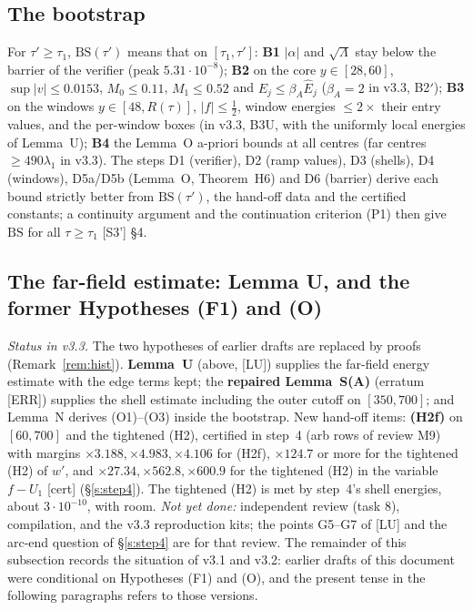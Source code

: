 \documentclass[11pt]{amsart}
\theoremstyle{definition}
\theoremstyle{remark}
\newcommand{\Lam}{\Lambda}
\newcommand{\dref}[1]{[\textsf{#1}]}
\begin{document}
\subsection{The bootstrap}\label{ss:boot}
For $\tau'\ge\tau_1$, $\mathrm{BS}(\tau')$ means that on $[\tau_1,\tau']$: \textbf{B1} $|\alpha|$ and $\sqrt\Lam$ stay below the barrier of the verifier (peak $5.31\cdot10^{-8}$); \textbf{B2} on the core $y\in[28,60]$, $\sup|v|\le0.0153$, $M_0\le0.11$, $M_1\le0.52$ and $E_j\le\beta_A\hat E_j$ ($\beta_A=2$ in v3.3, B2$'$); \textbf{B3} on the windows $y\in[48,R(\tau)]$, $|f|\le\frac12$, window energies $\le2\times$ their entry values, and the per-window boxes (in v3.3, B3U, with the uniformly local energies of Lemma~U); \textbf{B4} the Lemma~O a-priori bounds at all centres (far centres $\ge490\lambda_1$ in v3.3). The steps D1 (verifier), D2 (ramp values), D3 (shells), D4 (windows), D5a/D5b (Lemma~O, Theorem~H6) and D6 (barrier) derive each bound strictly better from $\mathrm{BS}(\tau')$, the hand-off data and the certified constants; a continuity argument and the continuation criterion (P1) then give $\mathrm{BS}$ for all $\tau\ge\tau_1$ \dref{S3'} \S4.

\subsection{The far-field estimate: Lemma U, and the former Hypotheses (F1) and (O)}\label{ss:gap}
\emph{Status in v3.3.} The two hypotheses of earlier drafts are replaced by proofs (Remark~\ref{rem:hist}). \textbf{Lemma~U} (above, \dref{LU}) supplies the far-field energy estimate with the edge terms kept; the \textbf{repaired Lemma~S(A)} (erratum \dref{ERR}) supplies the shell estimate including the outer cutoff on $[350,700]$; and Lemma~N derives (O1)--(O3) inside the bootstrap. New hand-off items: \textbf{(H2f)} on $[60,700]$ and the tightened (H2), certified in step~4 (arb rows of review M9) with margins $\times3.188,\times4.983,\times4.106$ for (H2f), $\times124.7$ or more for the tightened (H2) of $w'$, and $\times27.34,\times562.8,\times600.9$ for the tightened (H2) in the variable $f-U_1$ \textup{[cert]} (\S\ref{s:step4}). The tightened (H2) is met by step~4's shell energies, about $3\cdot10^{-10}$, with room. \emph{Not yet done:} independent review (task 8), compilation, and the v3.3 reproduction kits; the points G5--G7 of \dref{LU} and the arc-end question of \S\ref{s:step4} are for that review. The remainder of this subsection records the situation of v3.1 and v3.2: earlier drafts of this document were conditional on Hypotheses (F1) and (O), and the present tense in the following paragraphs refers to those versions.
\end{document}
